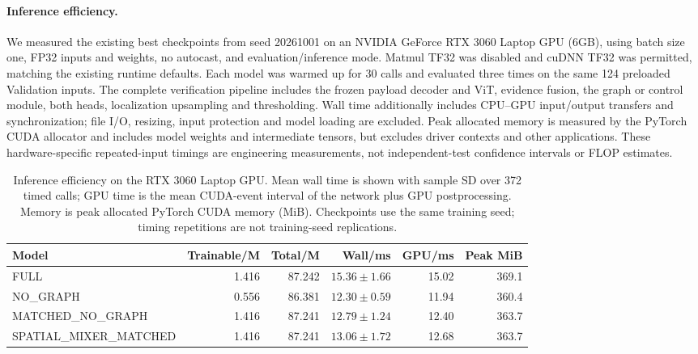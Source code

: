 \paragraph{Inference efficiency.}
We measured the existing best checkpoints from seed 20261001 on an
NVIDIA GeForce RTX 3060 Laptop GPU (6GB), using batch size one, FP32
inputs and weights, no autocast, and evaluation/inference mode.
Matmul TF32 was disabled and cuDNN TF32 was permitted, matching the
existing runtime defaults. Each model was warmed up for 30 calls and
evaluated three times on the same 124 preloaded Validation inputs.
The complete verification pipeline includes the frozen payload decoder
and ViT, evidence fusion, the graph or control module, both heads,
localization upsampling and thresholding. Wall time additionally
includes CPU--GPU input/output transfers and synchronization; file I/O,
resizing, input protection and model loading are excluded.
Peak allocated memory is measured by the PyTorch CUDA allocator and
includes model weights and intermediate tensors, but excludes driver
contexts and other applications. These hardware-specific repeated-input
timings are engineering measurements, not independent-test confidence
intervals or FLOP estimates.

\begin{table}[!tbp]
\centering
\caption{Inference efficiency on the RTX 3060 Laptop GPU. Mean wall time
is shown with sample SD over 372 timed calls; GPU time is the mean
CUDA-event interval of the network plus GPU postprocessing. Memory
is peak allocated PyTorch CUDA memory (MiB). Checkpoints use the same
training seed; timing repetitions are not training-seed replications.}
\label{tab:e10_inference_efficiency}
\small
\begin{tabular}{@{}lrrrrr@{}}
\toprule
Model & Trainable/M & Total/M & Wall/ms & GPU/ms & Peak MiB \\
\midrule
FULL & 1.416 & 87.242 & $15.36\pm1.66$ & 15.02 & 369.1 \\
NO\_GRAPH & 0.556 & 86.381 & $12.30\pm0.59$ & 11.94 & 360.4 \\
MATCHED\_NO\_GRAPH & 1.416 & 87.241 & $12.79\pm1.24$ & 12.40 & 363.7 \\
SPATIAL\_MIXER\_MATCHED & 1.416 & 87.241 & $13.06\pm1.72$ & 12.68 & 363.7 \\
\bottomrule
\end{tabular}
\end{table}

